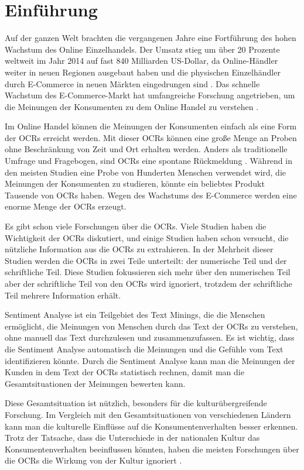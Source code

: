 \chapter{Einführung}
Auf der ganzen Welt brachten die vergangenen Jahre eine Fortführung des hohen Wachstum des Online Einzelhandels. Der Umsatz stieg um über 20 Prozente weltweit im Jahr 2014 auf fast 840 Milliarden US-Dollar, da Online-Händler weiter in neuen Regionen ausgebaut haben und die physischen Einzelhändler durch E-Commerce in neuen Märkten eingedrungen sind \citep{HanaBen-Shabat2015}. Das schnelle Wachstum des E-Commerce-Markt hat umfangreiche Forschung angetrieben, um die Meinungen der Konsumenten zu dem Online Handel zu verstehen \citep{tong2010cross}.

Im Online Handel können die Meinungen der Konsumenten einfach als eine Form der \ac{OCRs} erreicht werden. Mit dieser \ac{OCRs} können eine große Menge an Proben ohne Beschränkung von Zeit und Ort erhalten werden. Anders als traditionelle Umfrage und Fragebogen, sind \ac{OCRs} eine spontane Rückmeldung \citep{lu2015understanding}. Während in den meisten Studien eine Probe von Hunderten Menschen verwendet wird, die Meinungen der Konsumenten zu studieren, könnte ein beliebtes Produkt Tausende von \ac{OCRs} haben. Wegen des Wachstums des E-Commerce werden eine enorme Menge der \ac{OCRs} erzeugt.

Es gibt schon viele Forschungen über die \ac{OCRs}. Viele Studien haben die Wichtigkeit der \ac{OCRs} diskutiert, und einige Studien haben schon versucht, die nützliche Information aus die \ac{OCRs} zu extrahieren. In der Mehrheit dieser Studien werden die \ac{OCRs} in zwei Teile unterteilt: der numerische Teil und der schriftliche Teil. Diese Studien fokussieren sich mehr über den numerischen Teil aber der schriftliche Teil von den \ac{OCRs} wird ignoriert, trotzdem der schriftliche Teil mehrere Information erhält.

Sentiment Analyse ist ein Teilgebiet des Text Minings, die die Menschen ermöglicht, die Meinungen von Menschen durch das Text der \ac{OCRs} zu verstehen, ohne manuell das Text durchzulesen und zusammenzufassen. Es ist wichtig, dass die Sentiment Analyse automatisch die Meinungen und die Gefühle vom Text identifizieren könnte. Durch die Sentiment Analyse kann man die Meinungen der Kunden in dem Text der \ac{OCRs} statistisch rechnen, damit man die Gesamtsituationen der Meinungen bewerten kann.

Diese Gesamtsituation ist nützlich, besonders für die kulturübergreifende Forschung. Im Vergleich mit den Gesamtsituationen von verschiedenen Ländern kann man die kulturelle Einflüsse auf die Konsumentenverhalten besser erkennen. Trotz der Tatsache, dass die Unterschiede in der nationalen Kultur das Konsumentenverhalten beeinflussen könnten, haben die meisten Forschungen über die \ac{OCRs} die Wirkung von der Kultur ignoriert \citep{gefen2006need}.

